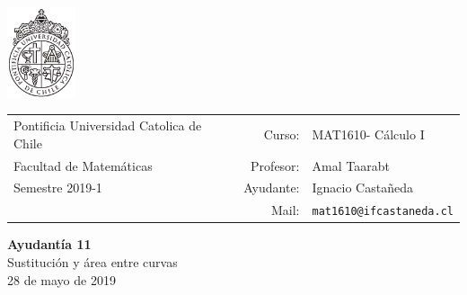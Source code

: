 \documentclass[12pt]{article}
\makeatletter
\newcommand{\ayudantia}{{\sc Ayudantía 11}}
\newcommand{\tituloayu}{Sustitución y área entre curvas}
\newcommand{\fecha}{28 de mayo de 2019}
\newcommand{\sigla}{MAT1610}
\newcommand{\nombre}{Cálculo I}
\newcommand{\profesor}{Amal Taarabt}
\newcommand{\ano}{2019}
\newcommand{\semestre}{1}
\newcommand{\mail}{mat1610@ifcastaneda.cl}
\makeatother
\begin{document}
\thispagestyle{empty}

\begin{minipage}{2cm}
	\includegraphics[width=2cm]{../../../../img/logo.pdf}
	\vspace{0.5cm}
\end{minipage}
\begin{minipage}{\linewidth}
	\begin{tabular}{lrl}
		{\scriptsize\sc Pontificia Universidad Catolica de Chile} & \hspace*{0.7in}Curso: &
		\sigla  - \nombre\\
		{\sc Facultad de Matemáticas}&
		Profesor: & \profesor \\
		{\sc Semestre \ano-\semestre} & Ayudante: & {Ignacio Castañeda}\\
		& {Mail:} & \texttt{\mail}
	\end{tabular}
\end{minipage}

\vspace{-10mm}
\begin{center}
	{\LARGE\bf \ayudantia}\\
	\vspace{0.1cm}
	{\tituloayu}\\
	\vspace{0.1cm}
	\fecha\\
	\vspace{0.4cm}
\end{center}
\end{document}
